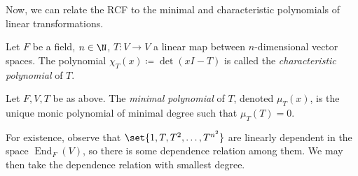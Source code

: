 \documentclass[10pt]{mypackage}
\renewcommand{\coloneq}{\coloneqq}
\begin{document}
Now, we can relate the RCF to the minimal and characteristic polynomials of linear transformations.
\begin{definition}
  Let $F$ be a field, $n\in \N$, $T\colon V\rightarrow V$ a linear map between $n$-dimensional vector spaces. The polynomial $\chi_T(x) \coloneq \det\left( xI - T \right)$ is called the \textit{characteristic polynomial} of $T$.
\end{definition}
\begin{definition}
  Let $F,V,T$ be as above. The \textit{minimal polynomial} of $T$, denoted $\mu_T(x)$, is the unique monic polynomial of minimal degree such that $\mu_T(T) = 0$.
\end{definition}
For existence, observe that $\set{1,T,T^2,\dots,T^{n^2}}$ are linearly dependent in the space $\operatorname{End}_F(V)$, so there is some dependence relation among them. We may then take the dependence relation with smallest degree.
\end{document}
